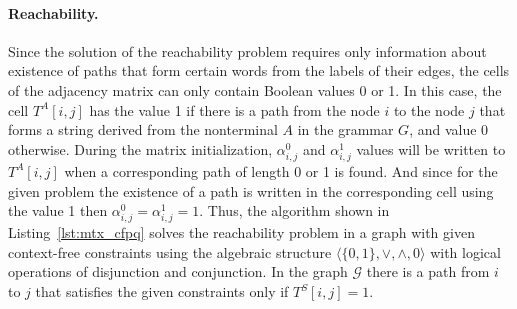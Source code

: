 \paragraph{Reachability.} %
Since the solution of the reachability problem requires only information about existence of paths that form certain words from the labels of their edges, the cells of the adjacency matrix can only contain Boolean values 0 or 1. In this case, the cell $T^A[i, j]$ has the value 1 if there is a path from the node $i$ to the node $j$ that forms a string derived from the nonterminal $A$ in the grammar $G$, and value 0 otherwise. During the matrix initialization, $\alpha^0_{i, j}$ and $\alpha^1_{i, j}$ values will be written to $T^A[i, j]$ when a corresponding path of length 0 or 1 is found. And since for the given problem the existence of a path is written in the corresponding cell using the value 1 then $\alpha^0_{i, j} = \alpha^1_{i, j} = 1$. Thus, the algorithm shown in Listing~\ref{lst:mtx_cfpq} solves the reachability problem in a graph with given context-free constraints using the algebraic structure $\langle \{0, 1\}, \vee, \wedge, 0 \rangle$ with logical operations of disjunction and conjunction. In the graph $\mathcal{G}$ there is a path from $i$ to $j$ that satisfies the given constraints only if $T^S[i, j] = 1$.

